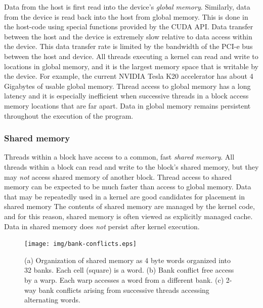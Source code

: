 Data from the host is first read into the
device's \emph{global memory}.
Similarly, data from the device is read back into the host
from global memory.
This is done in the host-code
using special functions provided by the CUDA API.
Data transfer between the host and the device is
extremely slow relative to data access within the device.
This data transfer rate is limited by the bandwidth
of the PCI-e bus between the host and device.
All threads executing a kernel can
read and write to locations in global memory,
and it is the largest memory space that is
writable by the device.
For example, the current NVIDIA Tesla K20 accelerator
has about 4 Gigabytes of usable global memory.
Thread access to global memory has a long latency
and it is especially inefficient when
successive threads in a block access memory locations
that are far apart.
Data in global memory remains persistent
throughout the execution of the program.

\subsubsection{Shared memory}
\label{subsubsec:shared-memory}

Threads within a block have access to a
common, fast \emph{shared memory}.
All threads within a block
can read and write to the block's shared memory,
but they may \emph{not} access
shared memory of another block.
Thread access to shared memory can be expected to be
much faster than access to global memory.
Data that may be repeatedly used in a kernel
are good candidates for placement in shared memory
The contents of shared memory are managed by the kernel code,
and for this reason,
shared memory is often viewed as explicitly managed cache.
Data in shared memory does \emph{not} persist after
kernel execution.

\begin{figure}
\begin{center}
\texttt{[image: img/bank-conflicts.eps]}
\end{center}
\caption{(a) Organization of shared memory as 4 byte words
    organized into 32 banks. Each cell (square) is a word.
    (b) Bank conflict free access by a warp. Each warp
    accesses a word from a different bank. (c) 2-way
    bank conflicts arising from successive threads accessing
alternating words.}
\label{fig:bank-conflicts}
\end{figure}

